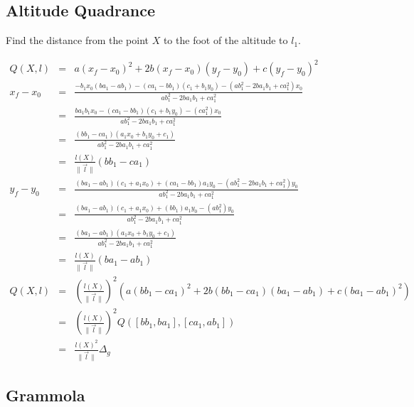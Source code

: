 \documentclass{article}
\begin{document}
\subsection{Altitude Quadrance}

Find the distance from the point $X$ to the foot of the altitude to $l_1$.

\begin{eqnarray}
Q(X, l) & = & a(x_f - x_0)^2 + 2b(x_f - x_0)(y_f - y_0) + c(y_f - y_0)^2\\
x_f - x_0 & = & \frac{-b_1x_0(ba_1 - ab_1) - (ca_1 - bb_1)(c_1 + b_1y_0) - (ab_1^2 - 2ba_1b_1 + ca_1^2)x_0}{ab_1^2 - 2ba_1b_1 + ca_1^2}\nonumber\\
          & = & \frac{ba_1b_1x_0 - (ca_1 - bb_1)(c_1 + b_1y_0) - (ca_1^2)x_0}{ab_1^2 - 2ba_1b_1 + ca_1^2}\nonumber\\
          & = & \frac{(bb_1 - ca_1)(a_1x_0 + b_1y_0 + c_1)}{ab_1^2 - 2ba_1b_1 + ca_1^2}\\
          & = & \frac{l(X)}{\|\vec{l}\|}(bb_1 - ca_1)\\
y_f - y_0 & = & \frac{(ba_1 - ab_1)(c_1 + a_1x_0) + (ca_1 - bb_1)a_1y_0 - (ab_1^2 - 2ba_1b_1 + ca_1^2)y_0 }{ab_1^2 - 2ba_1b_1 + ca_1^2}\nonumber\\
          & = & \frac{(ba_1 - ab_1)(c_1 + a_1x_0) + (bb_1)a_1y_0 - (ab_1^2)y_0 }{ab_1^2 - 2ba_1b_1 + ca_1^2}\nonumber\\
          & = & \frac{(ba_1 - ab_1)(a_1x_0 + b_1y_0 + c_1)}{ab_1^2 - 2ba_1b_1 + ca_1^2}\\
          & = & \frac{l(X)}{\|\vec{l}\|}(ba_1 - ab_1)\\
Q(X, l) & = & \left(\frac{l(X)}{\|\vec{l}\|}\right)^2\left( a(bb_1 - ca_1)^2 + 2b(bb_1 - ca_1)(ba_1 - ab_1) + c(ba_1 - ab_1)^2 \right)\nonumber\\
        & = & \left(\frac{l(X)}{\|\vec{l}\|}\right)^2 Q([bb_1, ba_1], [ca_1, ab_1])\\
        & = & \frac{l(X)^2}{\|\vec{l}\|}\Delta_g
\end{eqnarray}

\subsection{Grammola}
\end{document}
